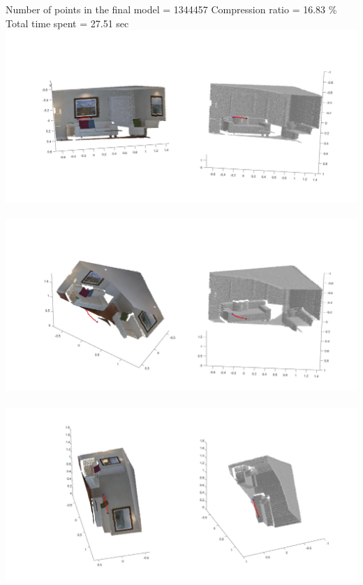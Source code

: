 \documentclass[fleqn]{article}
\begin{document}
\begin{adjustwidth}{4em}{0pt}
	Number of points in the final model = 1344457 \newline
	Compression ratio = 16.83 \% \newline
	Total time spent = 27.51 sec \newline
	\includegraphics[width = 1.25\textwidth,center]{slam_hw3_q2_d_part1_pic1.jpg}\\ \\
	\includegraphics[width = 1.25\textwidth,center]{slam_hw3_q2_d_part1_pic2.jpg}\\ \\
	\includegraphics[width = 1.25\textwidth,center]{slam_hw3_q2_d_part1_pic3.jpg}\\ \\
	\newline \newline
	

\end{adjustwidth}
\end{document}
